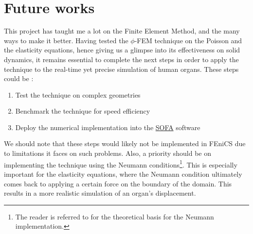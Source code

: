 
\chapter{Future works} %

\label{Chapter6} %

This project has taught me a lot on the Finite Element Method, and the many ways to make it better. Having tested the $\phi$-FEM technique on the Poisson and the elasticity equations, hence giving us a glimpse into its effectiveness on solid dynamics, it remains essential to complete the next steps in order to apply the technique to the real-time yet precise simulation of human organs. These steps could be :

\begin{enumerate}
    \item Test the technique on complex geometries
    \item Benchmark the technique for speed efficiency
    \item Deploy the numerical implementation into the \href{https://www.sofa-framework.org/}{SOFA} software
\end{enumerate}

\noindent We should note that these steps would likely not be implemented in FEniCS due to limitations it faces on such problems. Also, a priority should be on implementing the \phifem technique using the Neumann conditions\footnote{The reader is referred to \cite{Reference4} for the theoretical basis for the Neumann implementation.}. This is especially important for the elasticity equations, where the Neumann condition ultimately comes back to applying a certain force on the boundary of the domain. This results in a more realistic simulation of an organ's displacement. 

